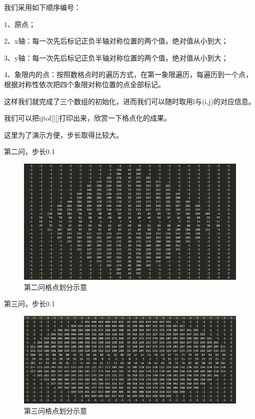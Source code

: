 \documentclass[10pt, a4paper]{article}
\begin{document}
    我们采用如下顺序编号：

    1、原点；

    2、x轴：每一次先后标记正负半轴对称位置的两个值，绝对值从小到大；

    3、y轴：每一次先后标记正负半轴对称位置的两个值，绝对值从小到大；

    4、象限内的点：按照数格点时的遍历方式，在第一象限遍历，每遍历到一个点，根据对称性依次把四个象限对称位置的点全部标记。

    这样我们就完成了三个数组的初始化，进而我们可以随时取用l与(i,j)的对应信息。

    我们可以把ijtol[][]打印出来，欣赏一下格点化的成果。

    这里为了演示方便，步长取得比较大。

    第二问，步长0.1

    \begin{figure}[H]
        \centering
        \includegraphics[width=1.0\textwidth]{第二问格点划分示意.png}
        \caption{第二问格点划分示意}\label{fig:第二问格点划分示意}
    \end{figure}

    第三问，步长0.1

    \begin{figure}[H]
        \centering
        \includegraphics[width=1.0\textwidth]{第三问格点划分示意.png}
        \caption{第三问格点划分示意}\label{fig:第三问格点划分示意}
    \end{figure}
\end{document}
